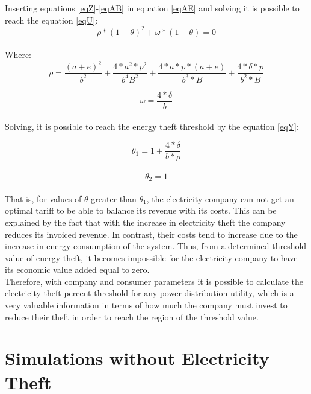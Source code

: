 \documentclass[10pt, letterpaper]{elsarticle}
\begin{document}
Inserting equations \ref{eqZ}-\ref{eqAB} in equation \ref{eqAE} and solving it is possible to reach the equation \ref{eqU}:\\
\begin{equation}
\rho*(1-\theta)^2+ \omega*(1-\theta) = 0
\label{eqU}
\end{equation}\\

Where:\\
\begin{equation}
\rho= \frac{(a+e)^2}{b^2}+\frac{4*a^2 * p^2}{b^4 B^2} + \frac{4*a*p*(a+e)}{b^3 * B}+ \frac{4*\delta*p}{b^2*B}
\label{eqV}
\end{equation}

\begin{equation}
\omega = \frac{4*\delta}{b}
\label{eqX}
\end{equation}\\
Solving, it is possible to reach the energy theft threshold by the equation \ref{eqY}:

\begin{equation}
\theta_1 = 1 + \frac{4* \delta}{b * \rho}
\label{eqY}
\end{equation}\\

\begin{equation}
\theta_2 = 1
\end{equation}\\

That is, for values of $\theta$ greater than $\theta_1$, the electricity company can not get an optimal tariff to be able to balance its revenue with its costs. This can be explained by the fact that with the increase in electricity theft the company reduces its invoiced revenue. In contrast, their costs tend to increase due to the increase in energy consumption of the system. Thus, from a determined threshold value of energy theft, it becomes impossible for the electricity company to have its economic value added equal to zero.\\
Therefore, with company and consumer parameters it is possible to calculate the electricity theft percent threshold for any power distribution utility, which is a very valuable information in terms of how much the company must invest to reduce their theft in order to reach the region of the threshold value.\\

\section{Simulations without Electricity Theft}
\label{S:3}
\end{document}
